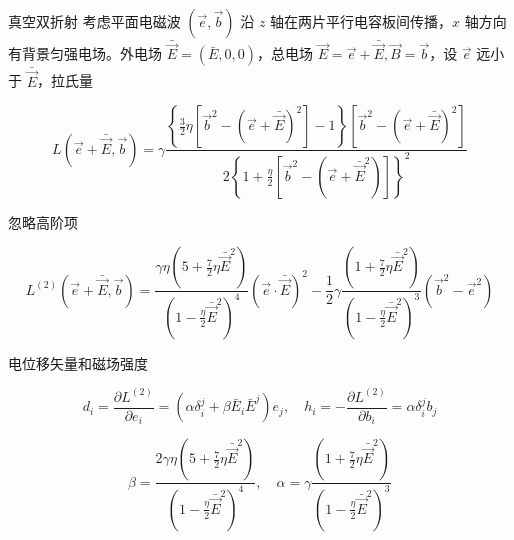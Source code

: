 \documentclass[9pt, dvipsnames]{beamer} %
\begin{document}
\begin{frame}{真空双折射}
        考虑平面电磁波 $(\vec{e},\vec{b}) $ 沿 $z $ 轴在两片平行电容板间传播，$x $ 轴方向有背景匀强电场。外电场 $\bar{\vec{E}}=(\bar{E},0,0) $，总电场 $\vec{E}=\vec{e}+\bar{\vec{E}},\vec{B}=\vec{b} $，设 $\vec{e} $ 远小于 $\bar{\vec{E}} $，拉氏量

    $$
    L\left(\vec{e}+\bar{\vec{E}},\vec{b} \right)
    =\gamma\frac{\left\{\frac{3 }{2 } \eta\left[\vec{b}^2-\left(\vec{e}+\bar{\vec{E}} \right)^2 \right] - 1 \right\}\left[\vec{b}^2-\left(\vec{e}+\bar{\vec{E}} \right)^2 \right] }{2\left\{1+\frac{\eta }{2 } \left[\vec{b}^2-\left(\vec{e} + \bar{\vec{E}}^2 \right) \right] \right\}^2 } 
    $$
    
    忽略高阶项
    
    $$
    L^{(2)}\left(\vec{e}+\bar{\vec{E}},\vec{b}\right)
    =\frac{\gamma\eta\left(5+\frac{7 }{2 } \eta \bar{\vec{E}}^2 \right) }{\left(1-\frac{\eta }{2 } \bar{\vec{E}}^2 \right)^4 }\left(\vec{e}\cdot\bar{\vec{E}} \right)^2 - \frac{1 }{2 } \gamma \frac{\left(1+\frac{7 }{2 } \eta \bar{\vec{E}}^2 \right) }{\left(1-\frac{\eta }{2 } \bar{\vec{E}}^2 \right)^3 }\left(\vec{b}^2-\vec{e}^2 \right) 
    $$
    
    电位移矢量和磁场强度
    
    $$
    d_i = \frac{\partial L^{(2)} }{\partial e_i } = \left(\alpha\delta_i^j+\beta\bar{E}_i\bar{E}^j \right)e_j,\quad
    h_i
    =-\frac{\partial L^{(2)} }{\partial b_i } 
    =\alpha\delta_i^j b_j 
    $$

    $$
    \beta = \frac{2\gamma \eta\left(5+\frac{7 }{2 } \eta \bar{\vec{E}}^2 \right) }{\left(1-\frac{\eta }{2 } \bar{\vec{E}}^2 \right)^4 },\quad 
    \alpha = \gamma \frac{\left(1+\frac{7 }{2 }\eta\bar{\vec{E}}^2 \right)  }{\left(1-\frac{\eta }{2 } \bar{\vec{E}}^2 \right)^3 }
    $$
\end{frame}
\end{document}
